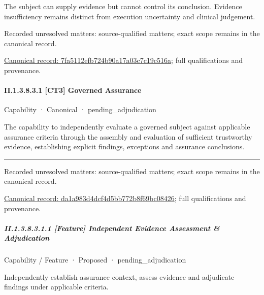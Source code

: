 The subject can supply evidence but cannot control its conclusion. Evidence insufficiency remains distinct from execution uncertainty and clinical judgement.


{\small Recorded unresolved matters: source-qualified matters; exact scope remains in the canonical record.}\par
{\footnotesize \href{../../../../continuum/strategy/capability/7fa5112efb724b90a17a03c7c19c516a.md}{Canonical record: 7fa5112efb724b90a17a03c7c19c516a}; full qualifications and provenance.}\par
\paragraph*{II.1.3.8.3.1 [CT3] Governed Assurance}
\label{navigation:II.1.3.8.3.1}

\label{element:da1a983d4dcf4d5bb772b8f69bc08426}
{\small Capability · Canonical · pending\_adjudication}\par

The capability to independently evaluate a governed subject against applicable assurance criteria through the assembly and evaluation of sufficient trustworthy evidence, establishing explicit findings, exceptions and assurance conclusions.



\medskip\hrule\medskip

{\small Recorded unresolved matters: source-qualified matters; exact scope remains in the canonical record.}\par
{\footnotesize \href{../../../../continuum/strategy/capability/da1a983d4dcf4d5bb772b8f69bc08426.md}{Canonical record: da1a983d4dcf4d5bb772b8f69bc08426}; full qualifications and provenance.}\par
\subparagraph*{II.1.3.8.3.1.1 [Feature] Independent Evidence Assessment \& Adjudication}
\label{navigation:II.1.3.8.3.1.1}

\label{element:3aedee8f78484b81955866bcf16b8a6d}
{\small Capability / Feature · Proposed · pending\_adjudication}\par

Independently establish assurance context, assess evidence and adjudicate findings under applicable criteria.



